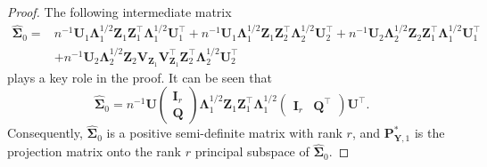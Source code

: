 \documentclass[10pt]{book}
\theoremstyle{definition}
\newcommand{\bQ}{\mathbf{Q}}
\newcommand{\bZ}{\mathbf{Z}}
\newcommand{\bP}{\mathbf{P}}
\newcommand{\bY}{\mathbf{Y}}
\newcommand{\bI}{\mathbf{I}}
\newcommand{\bU}{\mathbf{U}}
\newcommand{\bV}{\mathbf{V}}
\newcommand{\bfsym}[1]{\ensuremath{\boldsymbol{#1}}}
\def\bLambda {\bfsym {\Lambda}}
\def\bSigma {\bfsym {\Sigma}}
\begin{document}
\begin{proof}
    The following intermediate matrix
    \begin{equation*}
        \begin{split}
    \hat{\bSigma}_0 =&
    n^{-1}\bU_1 \bLambda_1^{1/2} \bZ_1 \bZ_1^\top \bLambda_1^{1/2}\bU_1^\top
    +n^{-1}\bU_1 \bLambda_1^{1/2} \bZ_1 \bZ_2^\top \bLambda_2^{1/2}\bU_2^\top
    +n^{-1}\bU_2 \bLambda_2^{1/2} \bZ_2 \bZ_1^\top \bLambda_1^{1/2}\bU_1^\top
    \\
    &+n^{-1}\bU_2 \bLambda_2^{1/2} \bZ_2 \bV_{\bZ_1}\bV_{\bZ_1}^\top
    \bZ_2^\top \bLambda_2^{1/2}\bU_2^\top
        \end{split}
    \end{equation*}
    plays a key role in the proof.
    It can be seen that 
    \begin{equation*}
        \hat{\bSigma}_0=n^{-1}
    \bU
    \begin{pmatrix}
       \bI_r \\
       \bQ
    \end{pmatrix}
    \bLambda_1^{1/2}\bZ_1 \bZ_1^\top\bLambda_1^{1/2}
    \begin{pmatrix}
        \bI_r
          &
          \bQ^\top
        \end{pmatrix}
        \bU^\top.
    \end{equation*}
    Consequently, $\hat{\bSigma}_0$ is a positive semi-definite matrix with rank $r$, and $\bP_{\bY,1}^*$ is the projection matrix onto the rank $r$ principal subspace of $\hat{\bSigma}_0$.


\end{proof}
\end{document}

